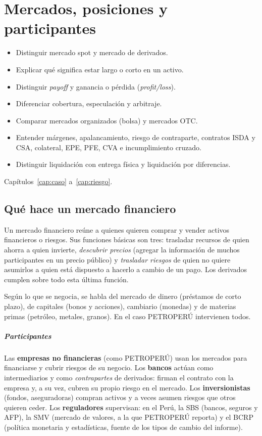 \chapter{Mercados, posiciones y participantes}\label{cap:mercados}

\begin{objetivos}
\begin{itemize}
\item Distinguir mercado spot y mercado de derivados.
\item Explicar qué significa estar largo o corto en un activo.
\item Distinguir \emph{payoff} y ganancia o pérdida (\emph{profit/loss}).
\item Diferenciar cobertura, especulación y arbitraje.
\item Comparar mercados organizados (bolsa) y mercados OTC.
\item Entender márgenes, apalancamiento, riesgo de contraparte, contratos ISDA y CSA, colateral, EPE, PFE, CVA e incumplimiento cruzado.
\item Distinguir liquidación con entrega física y liquidación por diferencias.
\end{itemize}
\end{objetivos}

\begin{prerreq}Capítulos~\ref{cap:caso} a~\ref{cap:riesgo}.\end{prerreq}

\section{Qué hace un mercado financiero}

Un mercado financiero reúne a quienes quieren comprar y vender activos financieros o riesgos. Sus funciones básicas son tres: trasladar recursos de quien ahorra a quien invierte, \emph{descubrir precios} (agregar la información de muchos participantes en un precio público) y \emph{trasladar riesgos} de quien no quiere asumirlos a quien está dispuesto a hacerlo a cambio de un pago. Los derivados cumplen sobre todo esta última función.

Según lo que se negocia, se habla del mercado de dinero (préstamos de corto plazo), de capitales (bonos y acciones), cambiario (monedas) y de materias primas (petróleo, metales, granos). En el caso PETROPERÚ intervienen todos.

\paragraph{Participantes} Las \textbf{empresas no financieras} (como PETROPERÚ) usan los mercados para financiarse y cubrir riesgos de su negocio. Los \textbf{bancos} actúan como intermediarios y como \emph{contrapartes} de derivados: firman el contrato con la empresa y, a su vez, cubren su propio riesgo en el mercado. Los \textbf{inversionistas} (fondos, aseguradoras) compran activos y a veces asumen riesgos que otros quieren ceder. Los \textbf{reguladores} supervisan: en el Perú, la SBS (bancos, seguros y AFP), la SMV (mercado de valores, a la que PETROPERÚ reporta) y el BCRP (política monetaria y estadísticas, fuente de los tipos de cambio del informe).

